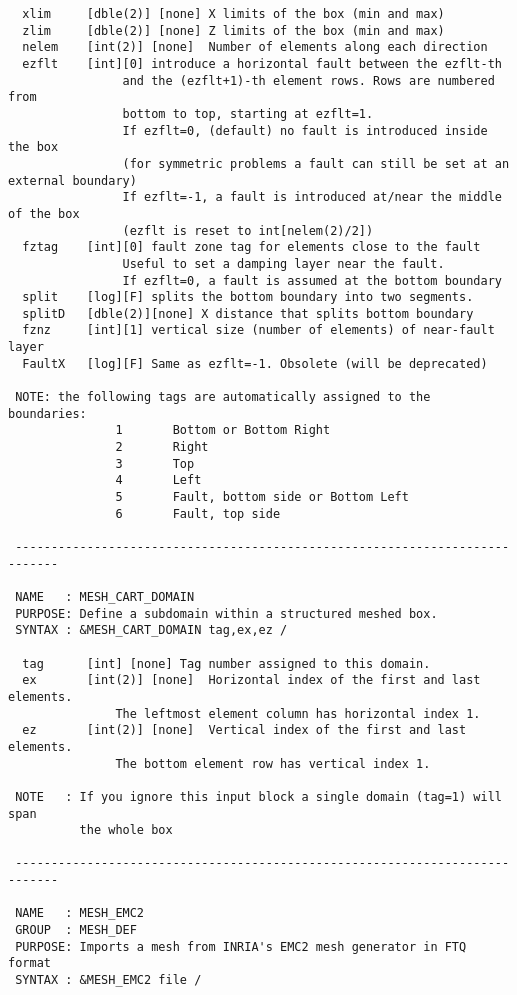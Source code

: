 \begin{verbatim}
  xlim     [dble(2)] [none] X limits of the box (min and max)
  zlim     [dble(2)] [none] Z limits of the box (min and max)
  nelem    [int(2)] [none]  Number of elements along each direction
  ezflt    [int][0] introduce a horizontal fault between the ezflt-th
                and the (ezflt+1)-th element rows. Rows are numbered from
                bottom to top, starting at ezflt=1.
                If ezflt=0, (default) no fault is introduced inside the box
                (for symmetric problems a fault can still be set at an external boundary)
                If ezflt=-1, a fault is introduced at/near the middle of the box
                (ezflt is reset to int[nelem(2)/2])
  fztag    [int][0] fault zone tag for elements close to the fault
                Useful to set a damping layer near the fault.
                If ezflt=0, a fault is assumed at the bottom boundary
  split    [log][F] splits the bottom boundary into two segments.
  splitD   [dble(2)][none] X distance that splits bottom boundary
  fznz     [int][1] vertical size (number of elements) of near-fault layer
  FaultX   [log][F] Same as ezflt=-1. Obsolete (will be deprecated) 

 NOTE: the following tags are automatically assigned to the boundaries: 
               1       Bottom or Bottom Right
               2       Right        
               3       Top  
               4       Left
               5       Fault, bottom side or Bottom Left
               6       Fault, top side

 ----------------------------------------------------------------------------

 NAME   : MESH_CART_DOMAIN
 PURPOSE: Define a subdomain within a structured meshed box.
 SYNTAX : &MESH_CART_DOMAIN tag,ex,ez /

  tag      [int] [none] Tag number assigned to this domain. 
  ex       [int(2)] [none]	Horizontal index of the first and last elements.
               The leftmost element column has horizontal index 1.
  ez       [int(2)] [none]	Vertical index of the first and last elements.
               The bottom element row has vertical index 1.

 NOTE   : If you ignore this input block a single domain (tag=1) will span 
          the whole box 

 ----------------------------------------------------------------------------

 NAME   : MESH_EMC2
 GROUP  : MESH_DEF
 PURPOSE: Imports a mesh from INRIA's EMC2 mesh generator in FTQ format
 SYNTAX : &MESH_EMC2 file /


\end{verbatim}
